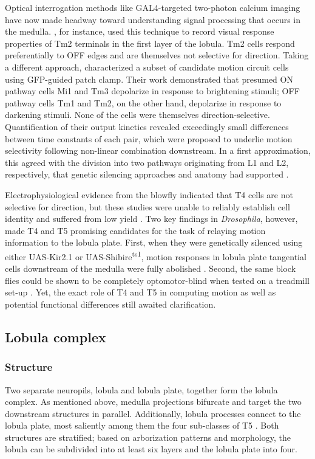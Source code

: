 Optical interrogation methods like GAL4-targeted two-photon calcium imaging have now made headway toward understanding signal processing that occurs in the medulla. \citet{Meier:2014fr}, for instance, used this technique to record visual response properties of Tm2 terminals in the first layer of the lobula. Tm2 cells respond preferentially to OFF edges and are themselves not selective for direction. Taking a different approach, \citet{Behnia:2014jh} characterized a subset of candidate motion circuit cells using GFP-guided patch clamp. Their work demonstrated that presumed ON pathway cells Mi1 and Tm3 depolarize in response to brightening stimuli; OFF pathway cells Tm1 and Tm2, on the other hand, depolarize in response to darkening stimuli. None of the cells were themselves direction-selective. Quantification of their output kinetics revealed exceedingly small differences between time constants of each pair, which were proposed to underlie motion selectivity following non-linear combination downstream. In a first approximation, this agreed with the division into two pathways originating from L1 and L2, respectively, that genetic silencing approaches and anatomy had supported \citep{Joesch:2010fw,Takemura:2013ea}.

Electrophysiological evidence from the blowfly indicated that T4 cells are not selective for direction, but these studies were unable to reliably establish cell identity and suffered from low yield \citep{Douglass:1996aa}. Two key findings in \textit{Drosophila}, however, made T4 and T5 promising candidates for the task of relaying motion information to the lobula plate. First, when they were genetically silenced using either UAS-Kir2.1 or UAS-Shibire\textsuperscript{ts1}, motion responses in lobula plate tangential cells downstream of the medulla were fully abolished \citep{Schnell:2012iz}. Second, the same block flies could be shown to be completely optomotor-blind when tested on a treadmill set-up \citep{Bahl:2013ha}. Yet, the exact role of T4 and T5 in computing motion as well as potential functional differences still awaited clarification.

\subsection{Lobula complex}

\subsubsection{Structure}
Two separate neuropils, lobula and lobula plate, together form the lobula complex. As mentioned above, medulla projections bifurcate and target the two downstream structures in parallel. Additionally, lobula processes connect to the lobula plate, most saliently among them the four sub-classes of T5 \citep{Fischbach:1989uw}. Both structures are stratified; based on arborization patterns and morphology, the lobula can be subdivided into at least six layers and the lobula plate into four.

